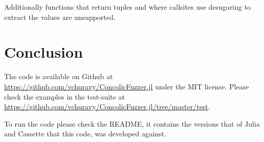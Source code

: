 \documentclass{article} %
\begin{document}
Additionally functions that return tuples and where callsites use desugaring to extract the values are unsupported.

\section{Conclusion}
The code is available on Github at \url{https://github.com/vchuravy/ConcolicFuzzer.jl} under the MIT license.
Please check the examples in the test-suite at \url{https://github.com/vchuravy/ConcolicFuzzer.jl/tree/master/test}.

To run the code please check the README, it contains the versions that of Julia and Cassette that this code,
was developed against.

\printbibliography
\end{document}
